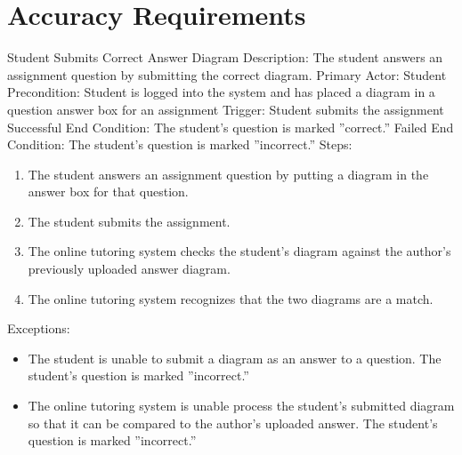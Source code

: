 
\chapter{Accuracy Requirements}
    
    \begin{section}{Student Submits Correct Answer Diagram}
        Description: The student answers an assignment question by submitting the correct diagram. \newline
        Primary Actor: Student \newline
        Precondition: Student is logged into the system and has placed a diagram in a question answer box for an assignment \newline  
        Trigger: Student submits the assignment \newline
        Successful End Condition: The student's question is marked ''correct.'' \newline
        Failed End Condition: The student's question is marked ''incorrect.'' \newline
        \newline
        Steps:
        \begin{enumerate}
            \item{The student answers an assignment question by putting a diagram in the answer box for that question.}
            \item{The student submits the assignment.}
            \item{The online tutoring system checks the student's diagram against the author's previously uploaded answer diagram.}
            \item{The online tutoring system recognizes that the two diagrams are a match.}
        \end{enumerate}
        Exceptions:
        \begin{itemize}
            \item{The student is unable to submit a diagram as an answer to a question.  The student's question is marked ''incorrect.''}  
            \item{The online tutoring system is unable process the student's submitted diagram so that it can be 
            compared to the author's uploaded answer.  The student's question is marked ''incorrect.''}
        \end{itemize}
    \end{section}
    

